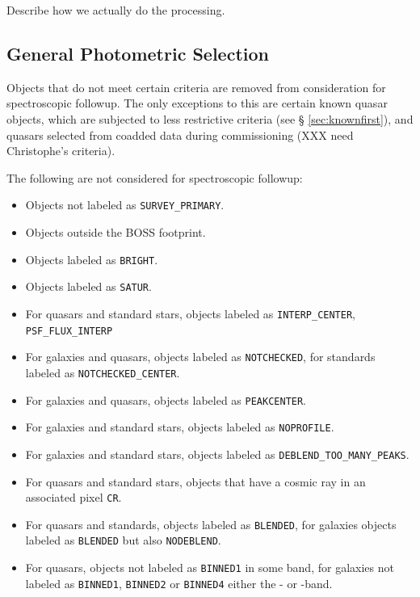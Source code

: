 \documentclass[12pt,preprint]{aastex}
\newcommand{\primary}{\texttt{SURVEY\_PRIMARY}}
\begin{document}
Describe how we actually do the processing.

\subsection{General Photometric Selection} \label{sec:genselect}

Objects that do not meet certain criteria are removed from consideration for
spectroscopic followup. The only exceptions to this are certain known quasar
objects, which are subjected to less restrictive criteria (see \S
\ref{sec:knownfirst}), and quasars selected from coadded data during
commissioning (XXX need Christophe's criteria).


The following are not considered for spectroscopic followup:

\begin{itemize}

    \item Objects not labeled as \primary.

    \item Objects outside the BOSS footprint.

    \item Objects labeled as \texttt{BRIGHT}.

    \item Objects labeled as \texttt{SATUR}.

    \item For quasars and standard stars, objects
        labeled as \texttt{INTERP\_CENTER}, 
        \texttt{PSF\_FLUX\_INTERP}

    \item For galaxies and quasars, objects labeled
        as \texttt{NOTCHECKED}, for standards labeled
        as \texttt{NOTCHECKED\_CENTER}.

    \item For galaxies and quasars, objects labeled as
        \texttt{PEAKCENTER}.

    \item For galaxies and standard stars, objects labeled
        as \texttt{NOPROFILE}.

    \item For galaxies and standard stars, objects labeled as 
        \texttt{DEBLEND\_TOO\_MANY\_PEAKS}.

    \item For quasars and standard stars, objects that have
        a cosmic ray in an associated pixel \texttt{CR}.
    
    \item For quasars and standards, objects labeled
        as \texttt{BLENDED}, for galaxies objects labeled
        as \texttt{BLENDED} but also \texttt{NODEBLEND}.


    \item For quasars, objects not labeled as \texttt{BINNED1} in some band, 
    for galaxies not labeled as \texttt{BINNED1}, \texttt{BINNED2}
    or \texttt{BINNED4} either the \rmag- or \imag-band.
   
\end{itemize}
\end{document}
